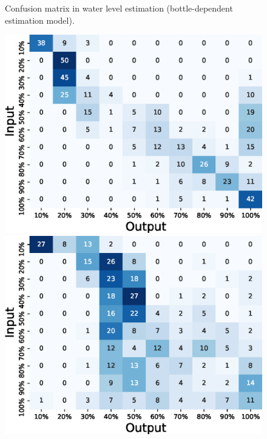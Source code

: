 \documentclass[sigconf]{acmart}
\begin{document}
\begin{figure}[!t]
\begin{minipage}[t]{0.32\linewidth}
  \end{minipage}
  \caption{Confusion matrix in water level estimation (bottle-dependent estimation model).}
  \label{fig:confusion_matrix_10_dependent}
\end{figure}

\begin{figure}[!t]
  \centering
  \begin{minipage}[t]{0.32\linewidth}
    \centering
    \includegraphics[width=0.9\linewidth]{figures/confusion_matrix_10_independent_coffee.eps}
  \end{minipage}
  \begin{minipage}[t]{0.32\linewidth}
    \centering
    \includegraphics[width=0.9\linewidth]{figures/confusion_matrix_10_independent_dishwashing.eps}

\end{minipage}
\end{figure}
\end{document}
